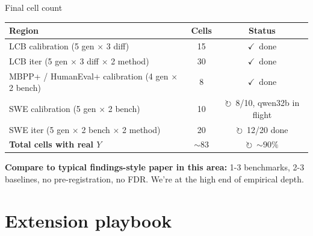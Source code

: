 \documentclass[10pt]{beamer}
\newcommand{\good}[1]{\textcolor{accentGreen}{\textbf{#1}}}
\newcommand{\done}{\textcolor{accentGreen}{$\checkmark$}}
\newcommand{\running}{\textcolor{accentOrange}{$\circlearrowright$}}
\begin{document}
\begin{frame}{Final cell count}
\vspace{0.3cm}
\begin{table}
\centering
\small
\begin{tabular}{lcc}
\toprule
\rowcolor{paleBlue}\textbf{Region} & \textbf{Cells} & \textbf{Status} \\
\midrule
\rowcolor{paleGreen}LCB calibration (5 gen $\times$ 3 diff) & 15 & \done\ done \\
\rowcolor{paleGreen}LCB iter (5 gen $\times$ 3 diff $\times$ 2 method) & 30 & \done\ done \\
\rowcolor{paleGreen}MBPP+ / HumanEval+ calibration (4 gen $\times$ 2 bench) & 8 & \done\ done \\
\rowcolor{paleOrange}SWE calibration (5 gen $\times$ 2 bench) & 10 & \running\ 8/10, qwen32b in flight \\
\rowcolor{paleOrange}SWE iter (5 gen $\times$ 2 bench $\times$ 2 method) & 20 & \running\ 12/20 done \\
\midrule
\rowcolor{paleBlue}\textbf{Total cells with real $Y$} & \textbf{${\sim}83$} & \running\ ${\sim}90\%$ \\
\bottomrule
\end{tabular}
\end{table}
\vspace{0.3cm}
\good{Compare to typical findings-style paper in this area:} 1-3 benchmarks, 2-3 baselines,
no pre-registration, no FDR. We're at the high end of empirical depth.
\end{frame}


\section{Extension playbook}
\end{document}
